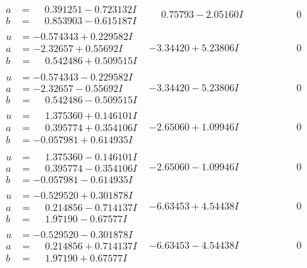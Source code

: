\documentclass[1p]{elsarticle_modified}
\theoremstyle{definition}
\begin{document}
$$\begin{array}{c|c|c}
\begin{aligned}
a &= \phantom{-}0.391251 - 0.723132 I \\
b &= \phantom{-}0.853903 - 0.615187 I\end{aligned}
 & \phantom{-}0.75793 - 2.05160 I & \phantom{-0.000000 } 0 \\ \hline\begin{aligned}
u &= -0.574343 + 0.229582 I \\
a &= -2.32657 + 0.55692 I \\
b &= \phantom{-}0.542486 + 0.509515 I\end{aligned}
 & -3.34420 + 5.23806 I & \phantom{-0.000000 } 0 \\ \hline\begin{aligned}
u &= -0.574343 - 0.229582 I \\
a &= -2.32657 - 0.55692 I \\
b &= \phantom{-}0.542486 - 0.509515 I\end{aligned}
 & -3.34420 - 5.23806 I & \phantom{-0.000000 } 0 \\ \hline\begin{aligned}
u &= \phantom{-}1.375360 + 0.146101 I \\
a &= \phantom{-}0.395774 + 0.354106 I \\
b &= -0.057981 + 0.614935 I\end{aligned}
 & -2.65060 + 1.09946 I & \phantom{-0.000000 } 0 \\ \hline\begin{aligned}
u &= \phantom{-}1.375360 - 0.146101 I \\
a &= \phantom{-}0.395774 - 0.354106 I \\
b &= -0.057981 - 0.614935 I\end{aligned}
 & -2.65060 - 1.09946 I & \phantom{-0.000000 } 0 \\ \hline\begin{aligned}
u &= -0.529520 + 0.301878 I \\
a &= \phantom{-}0.214856 - 0.714137 I \\
b &= \phantom{-}1.97190 - 0.67577 I\end{aligned}
 & -6.63453 + 4.54438 I & \phantom{-0.000000 } 0 \\ \hline\begin{aligned}
u &= -0.529520 - 0.301878 I \\
a &= \phantom{-}0.214856 + 0.714137 I \\
b &= \phantom{-}1.97190 + 0.67577 I\end{aligned}
 & -6.63453 - 4.54438 I & \phantom{-0.000000 } 0 \\ \hline\begin{aligned}

\end{aligned}
\end{array}$$
\end{document}
